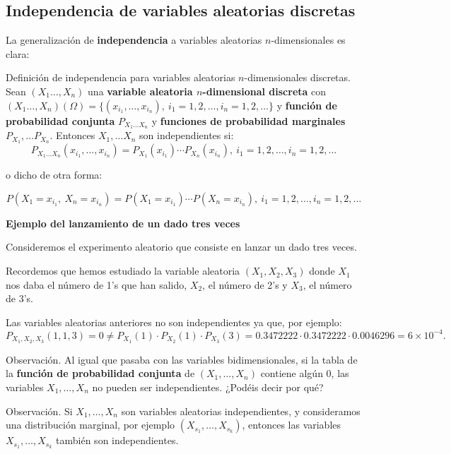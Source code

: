 \documentclass[]{book}
\begin{document}
\hypertarget{independencia-de-variables-aleatorias-discretas-1}{%
\subsection{Independencia de variables aleatorias discretas}\label{independencia-de-variables-aleatorias-discretas-1}}

La generalización de \textbf{independencia} a variables aleatorias \(n\)-dimensionales es clara:

Definición de independencia para variables aleatorias \(n\)-dimensionales discretas.
Sean \((X_1\ldots,X_n)\) una \textbf{variable aleatoria \(n\)-dimensional discreta} con \((X_1\ldots,X_n)(\Omega)=\{(x_{i_1},\ldots,x_{i_n}),\ i_1=1,2,\ldots,i_n=1,2,\ldots\}\) y \textbf{función de probabilidad conjunta} \(P_{X_1\ldots X_n}\) y \textbf{funciones de probabilidad marginales} \(P_{X_1},\ldots P_{X_n}\). Entonces \(X_1,\ldots X_n\) son independientes si:
\[
P_{X_1\ldots X_n}(x_{i_1},\ldots,x_{i_n})=P_{X_1}(x_{i_1})\cdots P_{X_n}(x_{i_n}),\ i_1=1,2,\ldots,i_n=1,2,\ldots
\]

o dicho de otra forma:

\[
P(X_1=x_{i_1},\ X_n=x_{i_n})=P(X_1=x_{i_1})\cdots P(X_n=x_{i_n}),\ i_1=1,2,\ldots,i_n=1,2,\ldots
\]

\textbf{Ejemplo del lanzamiento de un dado tres veces}

Consideremos el experimento aleatorio que consiste en lanzar un dado tres veces.

Recordemos que hemos estudiado la variable aleatoria \((X_1,X_2,X_3)\) donde \(X_1\) nos daba el número de 1's que han salido, \(X_2\), el número de 2's y \(X_3\), el número de 3's.

Las variables aleatorias anteriores no son independientes ya que, por ejemplo:
\[
P_{X_1,X_2,X_3}(1,1,3)=0\neq P_{X_1}(1)\cdot P_{X_2}(1)\cdot P_{X_3}(3)=0.3472222\cdot 0.3472222\cdot 0.0046296=\ensuremath{6\times 10^{-4}}.
\]

Observación.
Al igual que pasaba con las variables bidimensionales, si la tabla de la \textbf{función de probabilidad conjunta} de \((X_1,\ldots,X_n)\) contiene algún \(0\), las variables \(X_1,\ldots, X_n\) no pueden ser independientes. ¿Podéis decir por qué?

 Observación.
Si \(X_1,\ldots, X_n\) son variables aleatorias independientes, y consideramos una distribución marginal, por ejemplo \((X_{s_1},\ldots,X_{s_k})\), entonces las variables \(X_{s_1},\ldots,X_{s_k}\) también son independientes.
\end{document}
